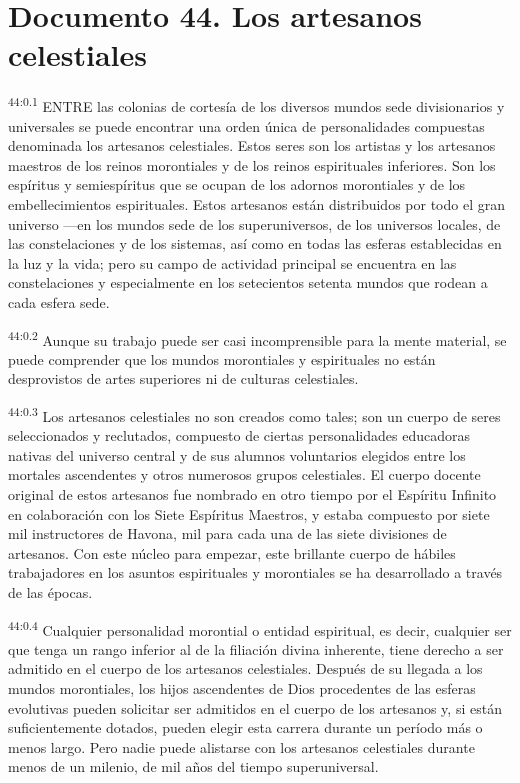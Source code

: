 \chapter{Documento 44. Los artesanos celestiales}
\par
\textsuperscript{44:0.1} ENTRE las colonias de cortesía de los diversos mundos sede divisionarios y universales se puede encontrar una orden única de personalidades compuestas denominada los artesanos celestiales. Estos seres son los artistas y los artesanos maestros de los reinos morontiales y de los reinos espirituales inferiores. Son los espíritus y semiespíritus que se ocupan de los adornos morontiales y de los embellecimientos espirituales. Estos artesanos están distribuidos por todo el gran universo ---en los mundos sede de los superuniversos, de los universos locales, de las constelaciones y de los sistemas, así como en todas las esferas establecidas en la luz y la vida; pero su campo de actividad principal se encuentra en las constelaciones y especialmente en los setecientos setenta mundos que rodean a cada esfera sede.

\par
\textsuperscript{44:0.2} Aunque su trabajo puede ser casi incomprensible para la mente material, se puede comprender que los mundos morontiales y espirituales no están desprovistos de artes superiores ni de culturas celestiales.

\par
\textsuperscript{44:0.3} Los artesanos celestiales no son creados como tales; son un cuerpo de seres seleccionados y reclutados, compuesto de ciertas personalidades educadoras nativas del universo central y de sus alumnos voluntarios elegidos entre los mortales ascendentes y otros numerosos grupos celestiales. El cuerpo docente original de estos artesanos fue nombrado en otro tiempo por el Espíritu Infinito en colaboración con los Siete Espíritus Maestros, y estaba compuesto por siete mil instructores de Havona, mil para cada una de las siete divisiones de artesanos. Con este núcleo para empezar, este brillante cuerpo de hábiles trabajadores en los asuntos espirituales y morontiales se ha desarrollado a través de las épocas.

\par
\textsuperscript{44:0.4} Cualquier personalidad morontial o entidad espiritual, es decir, cualquier ser que tenga un rango inferior al de la filiación divina inherente, tiene derecho a ser admitido en el cuerpo de los artesanos celestiales. Después de su llegada a los mundos morontiales, los hijos ascendentes de Dios procedentes de las esferas evolutivas pueden solicitar ser admitidos en el cuerpo de los artesanos y, si están suficientemente dotados, pueden elegir esta carrera durante un período más o menos largo. Pero nadie puede alistarse con los artesanos celestiales durante menos de un milenio, de mil años del tiempo superuniversal.

